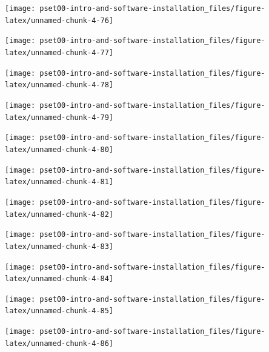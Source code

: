 \documentclass[
]{article}
\begin{document}
\begin{center}\texttt{[image: pset00-intro-and-software-installation\_files/figure-latex/unnamed-chunk-4-76]} \end{center}

\begin{center}\texttt{[image: pset00-intro-and-software-installation\_files/figure-latex/unnamed-chunk-4-77]} \end{center}

\begin{center}\texttt{[image: pset00-intro-and-software-installation\_files/figure-latex/unnamed-chunk-4-78]} \end{center}

\begin{center}\texttt{[image: pset00-intro-and-software-installation\_files/figure-latex/unnamed-chunk-4-79]} \end{center}

\begin{center}\texttt{[image: pset00-intro-and-software-installation\_files/figure-latex/unnamed-chunk-4-80]} \end{center}

\begin{center}\texttt{[image: pset00-intro-and-software-installation\_files/figure-latex/unnamed-chunk-4-81]} \end{center}

\begin{center}\texttt{[image: pset00-intro-and-software-installation\_files/figure-latex/unnamed-chunk-4-82]} \end{center}

\begin{center}\texttt{[image: pset00-intro-and-software-installation\_files/figure-latex/unnamed-chunk-4-83]} \end{center}

\begin{center}\texttt{[image: pset00-intro-and-software-installation\_files/figure-latex/unnamed-chunk-4-84]} \end{center}

\begin{center}\texttt{[image: pset00-intro-and-software-installation\_files/figure-latex/unnamed-chunk-4-85]} \end{center}

\begin{center}\texttt{[image: pset00-intro-and-software-installation\_files/figure-latex/unnamed-chunk-4-86]} \end{center}
\end{document}
